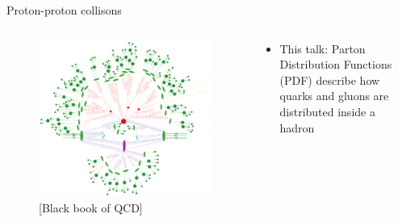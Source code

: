 \documentclass[8pt,t]{beamer}
\begin{document}
\begin{frame}{Proton-proton collisons}
  \begin{columns}
    \begin{column}{0.5\textwidth}
        \begin{figure}
          \includegraphics[width=0.99\textwidth]{proton_proton_diagram.png}
          \caption*{\color{gray}\footnotesize [Black book of QCD]}
        \end{figure}
      \end{column}
    \begin{column}{0.5\textwidth}
    \vspace*{2em}

      \begin{itemize}
        \item This talk: Parton Distribution Functions (PDF) describe how quarks and gluons are distributed inside a hadron
      \end{itemize}


\end{column}
\end{columns}
\end{frame}
\end{document}
